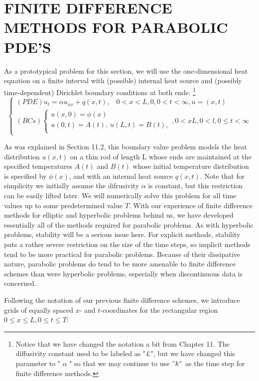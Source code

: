 \documentclass[../main.tex]{subfiles}
\begin{document}
\section{FINITE DIFFERENCE METHODS FOR PARABOLIC PDE'S}

As a prototypical problem for this section, we will use the one-dimensional heat equation on a finite interval with (possible) internal heat source and (possibly time-dependent) Dirichlet boundary conditions at both ends:
\footnote{Notice that we have changed the notation a bit from Chapter 11. The diffusivity constant used to be labeled as "£", but we have changed this parameter to " $\alpha$ " so that we may continue to use $"k"$ as the time step for finite difference methods. }
\begin{equation}
\begin{cases} 
	(PDE) u_t=\alpha u_{xx}+q(x,t),~~~~0<x<L,0, 0<t<\infty,u=(x,t)\\
(BCs)
		\begin{cases}
		 u(x,0)=\phi(x)\\
		 u(0,t)=A(t),~u(L,t)=B(t),\\
		\end{cases} 
		, 0< x L, 0 < l, 0\leqslant t < \infty
	\end{cases}
\end{equation}

As was explained in Section 11.2, this boundary value problem models the heat distribution $u(x,t)$ on a thin rod of length L whose ends are maintained at the specified temperatures $A(t)$ and $B(t)$ whose initial temperature distribution is specified by $\phi(x)$, and with an internal heat source $q(x,t)$. Note that for simplicity we initially assume the difrusivity $\alpha$ is constant, but this restriction can be easily lifted later. We will numerically solve this problem for all time values up to some predetermined value $T$. With our experience of finite difference methods for elliptic and hyperbolic problems behind us, we have developed essentially all of the methods required for parabolic problems. As with hyperbolic problems, stability will be a serious issue here. For explicit methods, stability puts a rather severe restriction on the size of the time steps, so implicit methods tend to be more practical for parabolic problems. Because of their dissipative nature, parabolic problems do tend to be more amenable to finite difference schemes than were hyperbolic problems, especially when discontinuous data is concerned. 


Following the notation of our previous finite difference schemes, we introduce grids of equally spaced $x$- and $t$-coordinates for the rectangular region $0 \leqslant x \leqslant L, 0\leqslant t \leqslant T$:
\end{document}
